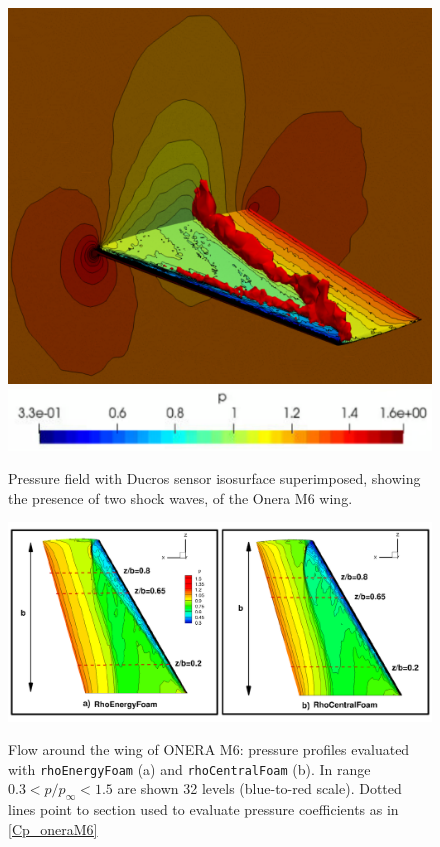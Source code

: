 \documentclass[a5paper]{sapthesis}
\begin{document}
	\begin{figure}[htp]
		\centering
		{\includegraphics[width=0.65\linewidth, height=0.32\textheight]{Figures/Ducros}}  
		\centering
		{\includegraphics[width=0.6\linewidth]{Figures/Ducros_bar}}
		\caption{Pressure field with Ducros sensor isosurface superimposed, showing the presence of two shock waves, of the Onera M6 wing.}
		\label{OneraM6_pressurefield}
	\end{figure}
	
	\begin{figure}[htp]
		\centering
		{\includegraphics[width=0.95\linewidth]{Figures/Cp_contours_oneram6}}  
		\caption[Pressure field of a flow around Onera M6 wing]{Flow around the wing of ONERA M6: pressure profiles evaluated with \texttt{rhoEnergyFoam} (a) and \texttt{rhoCentralFoam} (b). In range $0.3 < p/p_\infty < 1.5$ are shown 32 levels  (blue-to-red scale). Dotted lines point to section used to evaluate pressure coefficients as in \ref{Cp_oneraM6}}
		\label{Cp_contours_oneraM6}
	\end{figure}
	
\end{document}
